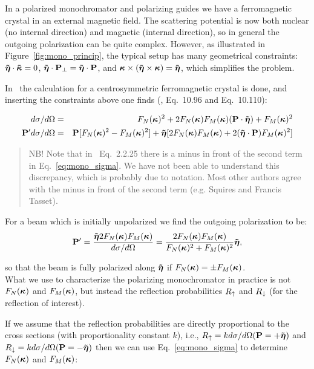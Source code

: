 In a polarized monochromator and polarizing guides we have a ferromagnetic
crystal in an external magnetic field. The scattering potential is now both
nuclear (no internal direction) and magnetic (internal direction), so in
general the outgoing polarization can be quite complex. However, as
illustrated in Figure~\ref{fig:mono_princip}, the typical setup has many
geometrical constraints: $\mathbf{\tilde{\mbox{\boldmath $\eta$}}} \cdot \mathbf{\tilde{\mathbf{\mbox{\boldmath $\kappa$}}}} = 0$, $\mathbf{\tilde{\mbox{\boldmath $\eta$}}} \cdot \mathbf{P}_\perp = \mathbf{\tilde{\mbox{\boldmath $\eta$}}} \cdot
\mathbf{P}$, and $\mathbf{\mbox{\boldmath $\kappa$}} \times (\mathbf{\tilde{\mbox{\boldmath $\eta$}}} \times \mathbf{\mbox{\boldmath $\kappa$}}) = \mathbf{\tilde{\mbox{\boldmath $\eta$}}}$, which simplifies the problem.

In~\cite{lovesey} the calculation for a centrosymmetric ferromagnetic
crystal is done, and inserting the constraints above one finds
(\cite{lovesey84}, Eq.~10.96 and Eq.~10.110):

\begin{eqnarray}
  \label{eq:mono_sigma}
  d\sigma/d\Omega & = & \FN^2 + 2\FN\FM (\PB \cdot \tN) + \FM^2\\
  \label{eq:mono_pol}
  \PB' d\sigma/d\Omega & = 
  & \PB [\FN^2 - \FM^2] + \tN [2\FN\FM + 2(\tN \cdot \PB)\FM^2]
\end{eqnarray}

\begin{quote}
  NB! Note that in~\cite{gavin} Eq.~2.2.25 there is a minus in front of the
  second term in Eq.~\ref{eq:mono_sigma}. We have not been able to understand
  this discrepancy, which is probably due to notation. Most other authors
  agree with the minus in front of the second term (e.g. Squires and Francis
  Tasset).
\end{quote}

For a beam which is initially unpolarized we find the outgoing
polarization to be:
\begin{equation}
  \mathbf{P}' = \frac{\mathbf{\tilde{\mbox{\boldmath $\eta$}}} 2F_N(\mathbf{\mbox{\boldmath $\kappa$}}) F_M(\mathbf{\mbox{\boldmath $\kappa$}})}{d\sigma/d\Omega} 
  = \frac{2F_N(\mathbf{\mbox{\boldmath $\kappa$}})F_M(\mathbf{\mbox{\boldmath $\kappa$}})}{F_N(\mathbf{\mbox{\boldmath $\kappa$}})^2 + F_M(\mathbf{\mbox{\boldmath $\kappa$}})^2} \mathbf{\tilde{\mbox{\boldmath $\eta$}}},
\end{equation}

so that the beam is fully polarized along $\mathbf{\tilde{\mbox{\boldmath $\eta$}}}$ if $F_N(\mathbf{\mbox{\boldmath $\kappa$}}) = \pm F_M(\mathbf{\mbox{\boldmath $\kappa$}})$. \\

What we use to characterize the polarizing monochromator in practice
is not $F_N(\mathbf{\mbox{\boldmath $\kappa$}})$ and $F_M(\mathbf{\mbox{\boldmath $\kappa$}})$, but instead the reflection probabilities $R_\uparrow$
and $R_\downarrow$ (for the reflection of interest).

If we assume that the reflection probabilities are directly proportional to
the cross sections (with proportionality constant $k$), i.e., $R_\uparrow = k
d\sigma/d\Omega(\mathbf{P}=+\mathbf{\tilde{\mbox{\boldmath $\eta$}}})$ and $R_\downarrow = k d\sigma/d\Omega(\mathbf{P}=-\mathbf{\tilde{\mbox{\boldmath $\eta$}}})$ then we can
use Eq.~\ref{eq:mono_sigma} to determine $F_N(\mathbf{\mbox{\boldmath $\kappa$}})$ and $F_M(\mathbf{\mbox{\boldmath $\kappa$}})$:

